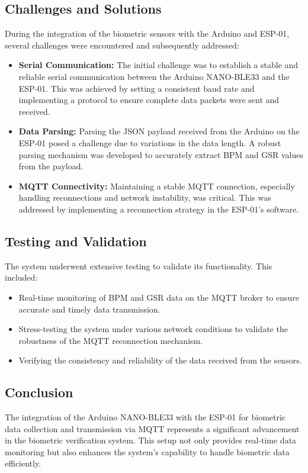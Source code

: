 \documentclass{article}
\begin{document}
\subsection{Challenges and Solutions}
During the integration of the biometric sensors with the Arduino and ESP-01, several challenges were encountered and subsequently addressed:
\begin{itemize}
\item \textbf{Serial Communication:} The initial challenge was to establish a stable and reliable serial communication between the Arduino NANO-BLE33 and the ESP-01. This was achieved by setting a consistent baud rate and implementing a protocol to ensure complete data packets were sent and received.
\item \textbf{Data Parsing:} Parsing the JSON payload received from the Arduino on the ESP-01 posed a challenge due to variations in the data length. A robust parsing mechanism was developed to accurately extract BPM and GSR values from the payload.
\item \textbf{MQTT Connectivity:} Maintaining a stable MQTT connection, especially handling reconnections and network instability, was critical. This was addressed by implementing a reconnection strategy in the ESP-01’s software.
\end{itemize}

\subsection{Testing and Validation}
The system underwent extensive testing to validate its functionality. This included:
\begin{itemize}
\item Real-time monitoring of BPM and GSR data on the MQTT broker to ensure accurate and timely data transmission.
\item Stress-testing the system under various network conditions to validate the robustness of the MQTT reconnection mechanism.
\item Verifying the consistency and reliability of the data received from the sensors.
\end{itemize}

\subsection{Conclusion}
The integration of the Arduino NANO-BLE33 with the ESP-01 for biometric data collection and transmission via MQTT represents a significant advancement in the biometric verification system. This setup not only provides real-time data monitoring but also enhances the system's capability to handle biometric data efficiently.
\end{document}
